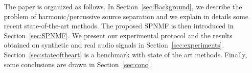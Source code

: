 
The paper is organized as follows. In Section~\ref{sec:Background}, we describe the problem of harmonic/percussive source separation and we explain in details some recent state-of-the-art methods. The proposed SPNMF is then introduced in Section~\ref{sec:SPNMF}. We present our experimental protocol and the results obtained on synthetic and real audio signals in Section~\ref{sec:experiments}. Section~\ref{sec:stateoftheart} is a benchmark with state of the art methods. Finally, some conclusions are drawn in Section~\ref{sec:conc}.


